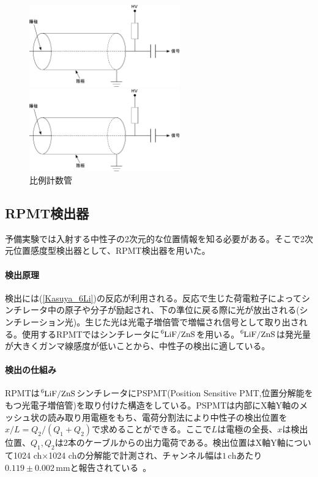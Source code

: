 \begin{figure}[h]
\begin{minipage}{0.5\hsize}
\begin{center}
\includegraphics[width=6.5cm]{detector/detector_fig1.pdf}
\end{center}
\end{minipage}
\begin{minipage}{0.5\hsize}
\begin{center}
\includegraphics[width=6.5cm]{detector/detector_fig1.pdf}
\end{center}
\end{minipage}
\caption{比例計数管}
\end{figure}

\subsection{RPMT検出器}
予備実験では入射する中性子の2次元的な位置情報を知る必要がある。そこで2次元位置感度型検出器として、RPMT検出器を用いた。

\paragraph{検出原理}
検出には(\ref{Kasuya_6Li})の反応が利用される。反応で生じた荷電粒子によってシンチレータ中の原子や分子が励起され、下の準位に戻る際に光が放出される(シンチレーション光)。生じた光は光電子増倍管で増幅され信号として取り出される。使用するRPMTではシンチレータに$\ce{^6LiF}/\ce{ZnS}$を用いる。$\ce{^6LiF}/\ce{ZnS}$は発光量が大きくガンマ線感度が低いことから、中性子の検出に適している。

\paragraph{検出の仕組み}
RPMTは$\ce{^6LiF}/\ce{ZnS}$シンチレータにPSPMT(Position Sensitive PMT,位置分解能をもつ光電子増倍管)を取り付けた構造をしている。PSPMTは内部にX軸Y軸のメッシュ状の読み取り用電極をもち、電荷分割法により中性子の検出位置を$x/L=Q_2/(Q_1+Q_2)$で求めることができる。ここで$L$は電極の全長、$x$は検出位置、$Q_1,Q_2$は2本のケーブルからの出力電荷である。検出位置はX軸Y軸について1024 ch$\times$1024 chの分解能で計測され、チャンネル幅は$1 \, \mathrm{ch}$あたり$0.119\pm0.002 \, \mathrm{mm}$と報告されている~\cite{KUANS_yamashita}。

